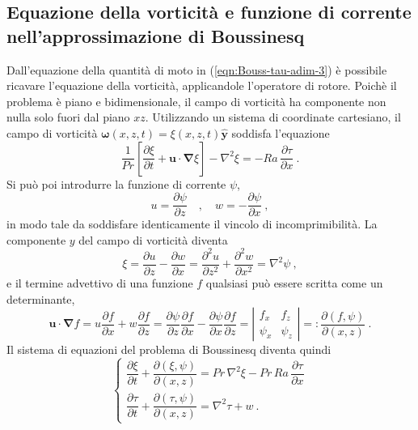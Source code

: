 \subsection{Equazione della vorticità e funzione di corrente nell'approssimazione di Boussinesq}
Dall'equazione della quantità di moto in (\ref{eqn:Bouss-tau-adim-3}) è possibile ricavare l'equazione della vorticità, applicandole l'operatore di rotore. Poichè il problema è piano e bidimensionale, il campo di vorticità ha componente non nulla solo fuori dal piano $xz$. Utilizzando un sistema di coordinate cartesiano, il campo di vorticità $\bm{\omega}(x,z,t) = \xi(x,z,t) \bm{\hat{y}}$ soddisfa l'equazione
\begin{equation}
    \dfrac{1}{Pr} \left[ \dfrac{\partial \xi}{\partial t} +
      \bm{u} \cdot \bm{\nabla} \xi \right] -
      \nabla^2 \xi = - Ra \, \dfrac{\partial \tau}{\partial x} \ .
\end{equation}
Si può poi introdurre la funzione di corrente $\psi$,
\begin{equation}
    u =   \dfrac{\partial \psi}{ \partial z} \quad , \quad 
    w = - \dfrac{\partial \psi}{ \partial x} \ ,
\end{equation}
in modo tale da soddisfare identicamente il vincolo di incomprimibilità. La componente $y$ del campo di vorticità diventa
\begin{equation}
    \xi = \dfrac{\partial u}{\partial z} - \dfrac{\partial w}{\partial x} =
    \dfrac{\partial^2 u}{\partial z^2} +
    \dfrac{\partial^2 w}{\partial x^2} = 
    \nabla^2 \psi \ ,
\end{equation}
e il termine advettivo di una funzione $f$ qualsiasi può essere scritta come un determinante,
\begin{equation}
    \bm{u} \cdot \bm{\nabla} f = u \dfrac{\partial f}{\partial x} + w \dfrac{\partial f}{\partial z} =
    \dfrac{\partial \psi}{ \partial z} \dfrac{\partial f}{\partial x} - \dfrac{\partial \psi}{ \partial x} \dfrac{\partial f}{\partial z} = \left| \begin{matrix} f_x & f_z \\ \psi_x & \psi_z \end{matrix} \right| =: \dfrac{\partial(f,\psi)}{\partial(x,z)} \ .
\end{equation}
%
Il sistema di equazioni del problema di Boussinesq diventa quindi
\begin{equation}\label{eqn:Bouss-vort-psi-tau}
    \begin{cases}
      \dfrac{\partial \xi}{\partial t} +
      \dfrac{\partial(\xi,\psi)}{\partial(x,z)} 
      = Pr \, \nabla^2 \xi 
      - Pr \, Ra \, \dfrac{\partial \tau}{\partial x} \\
      \dfrac{\partial \tau}{\partial t} +
      \dfrac{\partial(\tau,\psi)}{\partial(x,z)} =
      \nabla^{2} \tau + w \ .
    \end{cases}
\end{equation}

